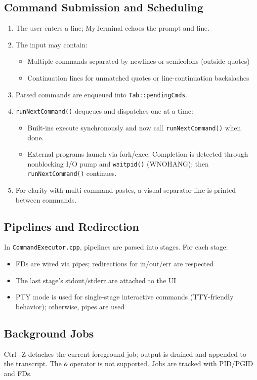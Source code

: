\documentclass[11pt,a4paper]{article}
\begin{document}
\subsection{Command Submission and Scheduling}
\begin{enumerate}[leftmargin=*]
\item The user enters a line; MyTerminal echoes the prompt and line.
\item The input may contain:
  \begin{itemize}
    \item Multiple commands separated by newlines or semicolons (outside quotes)
    \item Continuation lines for unmatched quotes or line-continuation backslashes
  \end{itemize}
\item Parsed commands are enqueued into \texttt{Tab::pendingCmds}.
\item \texttt{runNextCommand()} dequeues and dispatches one at a time:
  \begin{itemize}
    \item Built-ins execute synchronously and now call \texttt{runNextCommand()} when done.
    \item External programs launch via fork/exec. Completion is detected through nonblocking I/O pump and \texttt{waitpid()} (WNOHANG); then \texttt{runNextCommand()} continues.
  \end{itemize}
\item For clarity with multi-command pastes, a visual separator line is printed between commands.
\end{enumerate}

\subsection{Pipelines and Redirection}
In \texttt{CommandExecutor.cpp}, pipelines are parsed into stages. For each stage:
\begin{itemize}[leftmargin=*]
  \item FDs are wired via pipes; redirections for in/out/err are respected
  \item The last stage's stdout/stderr are attached to the UI
  \item PTY mode is used for single-stage interactive commands (TTY-friendly behavior); otherwise, pipes are used
\end{itemize}

\subsection{Background Jobs}
Ctrl+Z detaches the current foreground job; output is drained and appended to the transcript. The \texttt{\&} operator is not supported. Jobs are tracked with PID/PGID and FDs.
\end{document}

